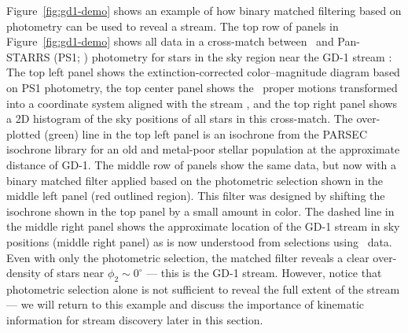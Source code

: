 \documentclass[final,5p,times,twocolumn,authoryear]{elsarticle}
\begin{document}
Figure~\ref{fig:gd1-demo} shows an example of how binary matched filtering based on
photometry can be used to reveal a stream.
The top row of panels in Figure~\ref{fig:gd1-demo} shows all data in a cross-match
between \gaia\ and Pan-STARRS (PS1; \citealt{chambers:2016}) photometry for stars in the
sky region near the GD-1 stream \citep{Grillmair:2006-gd1}: The top left panel shows the
extinction-corrected color--magnitude diagram based on PS1 photometry, the top center
panel shows the \gaia\ proper motions transformed into a coordinate system aligned with
the stream \citep{koposov:2010}, and the top right panel shows a 2D histogram of the sky
positions of all stars in this cross-match.
The over-plotted (green) line in the top left panel is an isochrone from the PARSEC
\citep{bressan:2012, chen:2015} isochrone library for an old and metal-poor stellar
population at the approximate distance of GD-1.
The middle row of panels show the same data, but now with a binary matched filter
applied based on the photometric selection shown in the middle left panel (red outlined
region).
This filter was designed by shifting the isochrone shown in the top panel by a small
amount in color.
The dashed line in the middle right panel shows the approximate location of the GD-1
stream in sky positions (middle right panel) as is now understood from selections using
\gaia\ data.
Even with only the photometric selection, the matched filter reveals a clear
over-density of stars near $\phi_2 \sim 0^\circ$ --- this is the GD-1 stream.
However, notice that photometric selection alone is not sufficient to reveal the full
extent of the stream --- we will return to this example and discuss the importance of
kinematic information for stream discovery later in this section.
\end{document}
